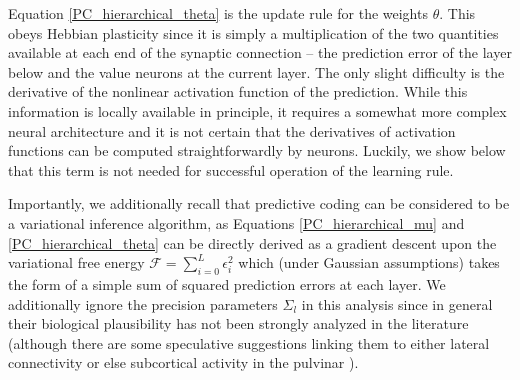Equation \ref{PC_hierarchical_theta} is the update rule for the weights $\theta$. This obeys Hebbian plasticity since it is simply a multiplication of the two quantities available at each end of the synaptic connection -- the prediction error of the layer below and the value neurons at the current layer. The only slight difficulty is the derivative of the nonlinear activation function of the prediction. While this information is locally available in principle, it requires a somewhat more complex neural architecture and it is not certain that the derivatives of activation functions can be computed straightforwardly by neurons. Luckily, we show below that this term is not needed for successful operation of the learning rule.

Importantly, we additionally recall that predictive coding can be considered to be a variational inference algorithm, as Equations \ref{PC_hierarchical_mu} and \ref{PC_hierarchical_theta} can be directly derived as a gradient descent upon the variational free energy $\mathcal{F} = \sum_{i=0}^L \epsilon_i^2$ which (under Gaussian assumptions) takes the form of a simple sum of squared prediction errors at each layer. We additionally ignore the precision parameters $\Sigma_l$ in this analysis since in general their biological plausibility has not been strongly analyzed in the literature (although there are some speculative suggestions linking them to either lateral connectivity \citep{friston2005theory} or else subcortical activity in the pulvinar \citep{kanai2015cerebral}).

